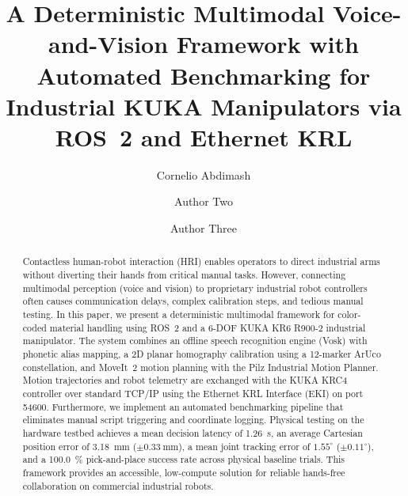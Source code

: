 \documentclass[runningheads]{llncs}
\begin{document}
\title{A Deterministic Multimodal Voice-and-Vision Framework with Automated Benchmarking for Industrial KUKA Manipulators via ROS~2 and Ethernet KRL}


\author{Cornelio Abdimash \and
Author Two \and
Author Three}



\maketitle

\begin{abstract}
Contactless human-robot interaction (HRI) enables operators to direct industrial arms without diverting their hands from critical manual tasks. However, connecting multimodal perception (voice and vision) to proprietary industrial robot controllers often causes communication delays, complex calibration steps, and tedious manual testing. In this paper, we present a deterministic multimodal framework for color-coded material handling using ROS~2 and a 6-DOF KUKA KR6 R900-2 industrial manipulator. The system combines an offline speech recognition engine (Vosk) with phonetic alias mapping, a 2D planar homography calibration using a 12-marker ArUco constellation, and MoveIt~2 motion planning with the Pilz Industrial Motion Planner. Motion trajectories and robot telemetry are exchanged with the KUKA KRC4 controller over standard TCP/IP using the Ethernet KRL Interface (EKI) on port 54600. Furthermore, we implement an automated benchmarking pipeline that eliminates manual script triggering and coordinate logging. Physical testing on the hardware testbed achieves a mean decision latency of \SI{1.26}{\second}, an average Cartesian position error of \SI{3.18}{\milli\meter} ($\pm\SI{0.33}{\milli\meter}$), a mean joint tracking error of $1.55^\circ$ ($\pm 0.11^\circ$), and a \SI{100.0}{\percent} pick-and-place success rate across physical baseline trials. This framework provides an accessible, low-compute solution for reliable hands-free collaboration on commercial industrial robots.

\end{abstract}
\end{document}
